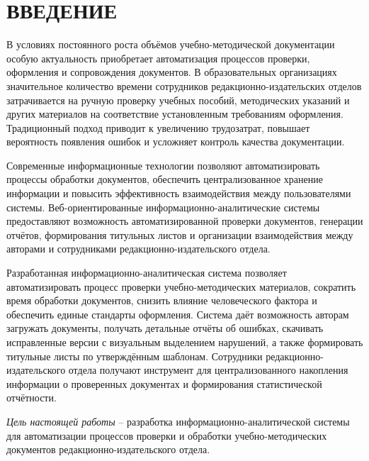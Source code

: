 \section*{ВВЕДЕНИЕ}

В условиях постоянного роста объёмов учебно-методической документации особую актуальность приобретает автоматизация процессов проверки, оформления и сопровождения документов. В образовательных организациях значительное количество времени сотрудников редакционно-издательских отделов затрачивается на ручную проверку учебных пособий, методических указаний и других материалов на соответствие установленным требованиям оформления. Традиционный подход приводит к увеличению трудозатрат, повышает вероятность появления ошибок и усложняет контроль качества документации.

Современные информационные технологии позволяют автоматизировать процессы обработки документов, обеспечить централизованное хранение информации и повысить эффективность взаимодействия между пользователями системы. Веб-ориентированные информационно-аналитические системы предоставляют возможность автоматизированной проверки документов, генерации отчётов, формирования титульных листов и организации взаимодействия между авторами и сотрудниками редакционно-издательского отдела.

Разработанная информационно-аналитическая система позволяет автоматизировать процесс проверки учебно-методических материалов, сократить время обработки документов, снизить влияние человеческого фактора и обеспечить единые стандарты оформления. Система даёт возможность авторам загружать документы, получать детальные отчёты об ошибках, скачивать исправленные версии с визуальным выделением нарушений, а также формировать титульные листы по утверждённым шаблонам. Сотрудники редакционно-издательского отдела получают инструмент для централизованного накопления информации о проверенных документах и формирования статистической отчётности.

\textit{Цель настоящей работы} – разработка информационно-аналитической системы для автоматизации процессов проверки и обработки учебно-методических документов редакционно-издательского отдела.

